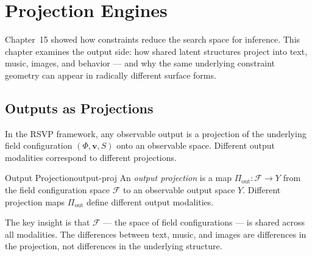 
\chapter{Projection Engines}



Chapter~15 showed how constraints reduce the search space for inference.
This chapter examines the output side: how shared latent structures project
into text, music, images, and behavior — and why the same underlying
constraint geometry can appear in radically different surface forms.

\section{Outputs as Projections}

In the RSVP framework, any observable output is a projection of the
underlying field configuration $(\Phi, \mathbf{v}, S)$ onto an
observable space. Different output modalities correspond to different
projections.

\begin{definition}{Output Projection}{output-proj}
  An \emph{output projection} is a map $\Pi_\text{out} : \mathcal{F} \to Y$
  from the field configuration space $\mathcal{F}$ to an observable
  output space $Y$. Different projection maps $\Pi_\text{out}$ define
  different output modalities.
\end{definition}

The key insight is that $\mathcal{F}$ — the space of field configurations —
is shared across all modalities. The differences between text, music,
and images are differences in the projection, not differences in the
underlying structure.

